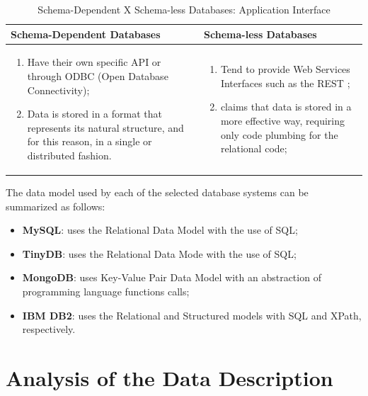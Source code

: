 \begin{table}[!h]
    \label{tab:api-interface-schema-vs-schemaless}
    \caption{Schema-Dependent X Schema-less Databases: Application Interface}
    \begin{center}
    \begin{tabular}{|p{210pt}|p{210pt}|}\hline
    Schema-Dependent Databases & Schema-less Databases\\\hline
    \begin{enumerate}
      \item Have their own specific API or through ODBC (Open Database
      Connectivity);
      \item Data is stored in a format that represents its natural structure,
      and for this reason, in a single or distributed fashion.
    \end{enumerate} 
    & 
    \begin{enumerate}
      \item Tend to provide Web Services Interfaces such as the REST
      \cite{http-rest};
      \item \cite{db-is-rdbs-dommed} claims that data is stored in a more
      effective way, requiring only code plumbing for the relational code;
    \end{enumerate}
    \\\hline
    \end{tabular}
    \end{center}
\end{table}

The data model used by each of the selected database systems can be summarized
as follows:

\begin{itemize}
  \item \textbf{MySQL}: uses the Relational Data Model with the use of SQL;
  \item \textbf{TinyDB}: uses the Relational Data Mode with the use of SQL; 
  \item \textbf{MongoDB}: uses Key-Value Pair Data Model with an abstraction of 
  programming language functions calls;
  \item \textbf{IBM DB2}: uses the Relational and Structured models with SQL
  and XPath, respectively.
\end{itemize}

\section{Analysis of the Data Description}

